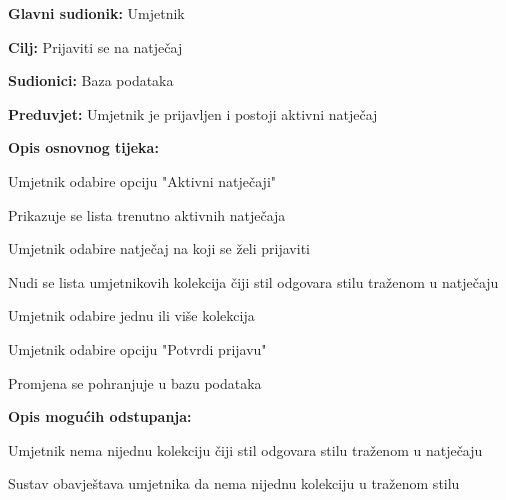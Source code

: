 					\noindent {}
					\begin{packed_item}
						
						\item \textbf{Glavni sudionik: }Umjetnik
						\item  \textbf{Cilj: }Prijaviti se na natječaj
						\item  \textbf{Sudionici: }Baza podataka
						\item  \textbf{Preduvjet:} Umjetnik je prijavljen i postoji aktivni natječaj
						\item  \textbf{Opis osnovnog tijeka:}
						
						\item[] \begin{packed_enum}
							
							\item Umjetnik odabire opciju "Aktivni natječaji"
							\item Prikazuje se lista trenutno
							aktivnih natječaja
							\item Umjetnik odabire natječaj na koji se želi prijaviti
							\item Nudi se lista umjetnikovih kolekcija čiji stil odgovara stilu traženom u natječaju
							\item Umjetnik odabire jednu ili više kolekcija
							\item Umjetnik odabire opciju "Potvrdi prijavu"
							\item Promjena se pohranjuje u bazu podataka
							
						\end{packed_enum}
						
						\item  \textbf{Opis mogućih odstupanja:}
						
						\item[] \begin{packed_item}
							
							\item[4.a] Umjetnik nema nijednu kolekciju čiji stil odgovara stilu traženom u natječaju
							\item[] \begin{packed_enum}
								\item Sustav obavještava umjetnika da nema nijednu kolekciju u traženom stilu
							\end{packed_enum}
							
						\end{packed_item}
					\end{packed_item}
					
